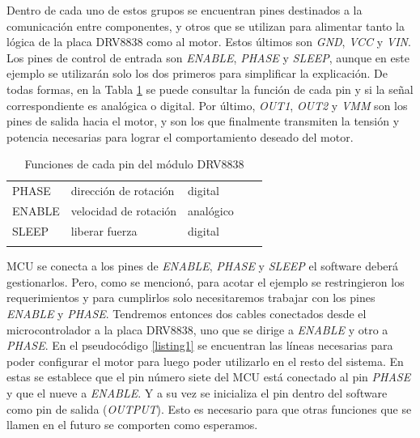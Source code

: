 Dentro de cada uno de estos grupos se encuentran pines destinados a la comunicación entre componentes, y otros que se utilizan para alimentar tanto la lógica de la placa \gls{DRV8838} como al motor. Estos últimos son \textit{GND}, \textit{VCC} y \textit{VIN}. Los pines de control de entrada son \textit{ENABLE}, \textit{PHASE} y \textit{SLEEP}, aunque en este ejemplo se utilizarán solo los dos primeros para simplificar la explicación. De todas formas, en la Tabla \ref{funciones_pin_drv8838} se puede consultar la función de cada pin y si la señal correspondiente es analógica o digital. Por último, \textit{OUT1}, \textit{OUT2} y \textit{VMM} son los pines de salida hacia el motor, y son los que finalmente transmiten la tensión y potencia necesarias para lograr el comportamiento deseado del motor.

\begin{table}[H]
\centering
\begin{tabular}{lllll}
\cline{1-3}
\multicolumn{1}{|l|}{PHASE}  & \multicolumn{1}{l|}{dirección de rotación} & \multicolumn{1}{l|}{digital}   &  &  \\ \cline{1-3}
\multicolumn{1}{|l|}{ENABLE} & \multicolumn{1}{l|}{velocidad de rotación} & \multicolumn{1}{l|}{analógico} &  &  \\ \cline{1-3}
\multicolumn{1}{|l|}{SLEEP}  & \multicolumn{1}{l|}{liberar fuerza}        & \multicolumn{1}{l|}{digital}   &  &  \\ \cline{1-3}
                             &                                            &                                &  & 
\end{tabular}
\caption{Funciones de cada pin del módulo DRV8838}
\label{funciones_pin_drv8838}
\end{table}

\gls{MCU} se conecta a los pines de \textit{ENABLE}, \textit{PHASE} y \textit{SLEEP} el software deberá gestionarlos. Pero, como se mencionó, para acotar el ejemplo se restringieron los requerimientos y para cumplirlos solo necesitaremos trabajar con los pines \textit{ENABLE} y \textit{PHASE}. Tendremos entonces dos cables conectados desde el \gls{microcontrolador} a la placa \gls{DRV8838}, uno que se dirige a \textit{ENABLE} y otro a \textit{PHASE}. En el pseudocódigo \ref{listing1} se encuentran las líneas necesarias para poder configurar el motor para luego poder utilizarlo en el resto del sistema. En estas se establece que el pin número siete del \gls{MCU} está conectado al pin \textit{PHASE} y que el nueve a \textit{ENABLE}. Y a su vez se inicializa el pin dentro del software como pin de salida (\textit{OUTPUT}). Esto es necesario para que otras funciones que se llamen en el futuro se comporten como esperamos.

